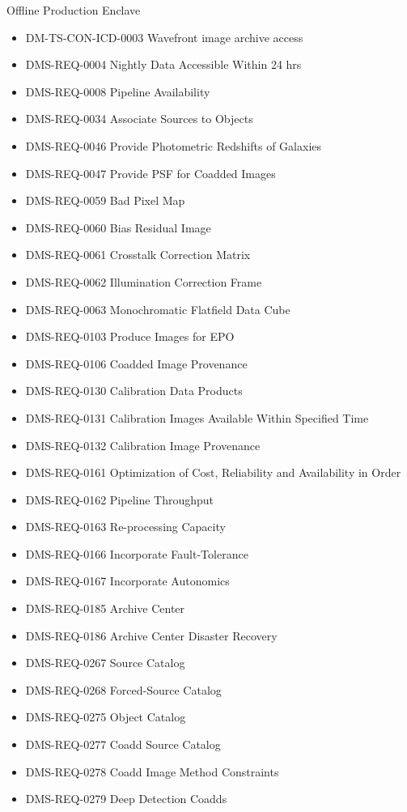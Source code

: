 Offline Production Enclave \begin{itemize}
\item DM-TS-CON-ICD-0003 Wavefront image archive access
\item DMS-REQ-0004 Nightly Data Accessible Within 24 hrs
\item DMS-REQ-0008 Pipeline Availability
\item DMS-REQ-0034 Associate Sources to Objects
\item DMS-REQ-0046 Provide Photometric Redshifts of Galaxies
\item DMS-REQ-0047 Provide PSF for Coadded Images
\item DMS-REQ-0059 Bad Pixel Map
\item DMS-REQ-0060 Bias Residual Image
\item DMS-REQ-0061 Crosstalk Correction Matrix
\item DMS-REQ-0062 Illumination Correction Frame
\item DMS-REQ-0063 Monochromatic Flatfield Data Cube
\item DMS-REQ-0103 Produce Images for EPO
\item DMS-REQ-0106 Coadded Image Provenance
\item DMS-REQ-0130 Calibration Data Products
\item DMS-REQ-0131 Calibration Images Available Within Specified Time
\item DMS-REQ-0132 Calibration Image Provenance
\item DMS-REQ-0161 Optimization of Cost, Reliability and Availability in Order
\item DMS-REQ-0162 Pipeline Throughput
\item DMS-REQ-0163 Re-processing Capacity
\item DMS-REQ-0166 Incorporate Fault-Tolerance
\item DMS-REQ-0167 Incorporate Autonomics
\item DMS-REQ-0185 Archive Center
\item DMS-REQ-0186 Archive Center Disaster Recovery
\item DMS-REQ-0267 Source Catalog
\item DMS-REQ-0268 Forced-Source Catalog
\item DMS-REQ-0275 Object Catalog
\item DMS-REQ-0277 Coadd Source Catalog
\item DMS-REQ-0278 Coadd Image Method Constraints
\item DMS-REQ-0279 Deep Detection Coadds

\end{itemize}
